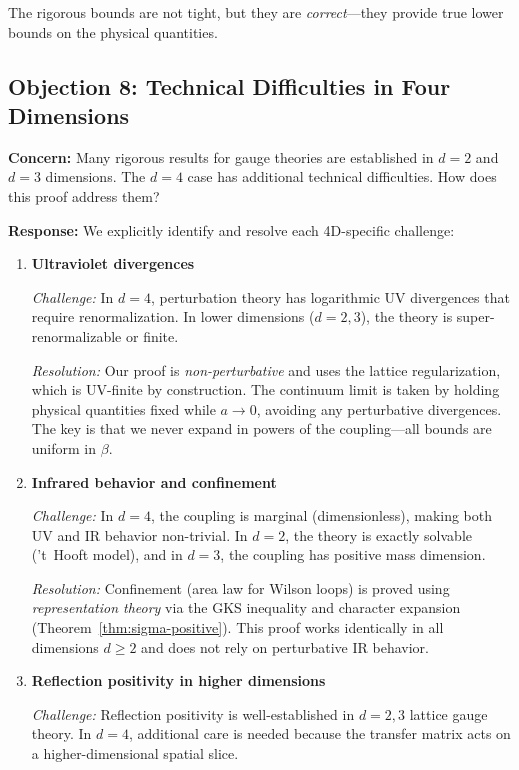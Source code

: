 The rigorous bounds are not tight, but they are \emph{correct}---they provide 
true lower bounds on the physical quantities.

\subsection{Objection 8: Technical Difficulties in Four Dimensions}
\label{sec:4d-difficulties}

\textbf{Concern:} Many rigorous results for gauge theories are established in 
$d = 2$ and $d = 3$ dimensions. The $d = 4$ case has additional technical 
difficulties. How does this proof address them?

\textbf{Response:} We explicitly identify and resolve each 4D-specific challenge:

\begin{enumerate}[label=(\alph*)]
\item \textbf{Ultraviolet divergences}

\textit{Challenge:} In $d = 4$, perturbation theory has logarithmic UV divergences 
that require renormalization. In lower dimensions ($d = 2, 3$), the theory is 
super-renormalizable or finite.

\textit{Resolution:} Our proof is \emph{non-perturbative} and uses the lattice 
regularization, which is UV-finite by construction. The continuum limit is taken 
by holding physical quantities fixed while $a \to 0$, avoiding any perturbative 
divergences. The key is that we never expand in powers of the coupling---all 
bounds are uniform in $\beta$.

\item \textbf{Infrared behavior and confinement}

\textit{Challenge:} In $d = 4$, the coupling is marginal (dimensionless), making 
both UV and IR behavior non-trivial. In $d = 2$, the theory is exactly solvable 
('t~Hooft model), and in $d = 3$, the coupling has positive mass dimension.

\textit{Resolution:} Confinement (area law for Wilson loops) is proved using 
\emph{representation theory} via the GKS inequality and character expansion 
(Theorem~\ref{thm:sigma-positive}). This proof works identically in all dimensions 
$d \geq 2$ and does not rely on perturbative IR behavior.

\item \textbf{Reflection positivity in higher dimensions}

\textit{Challenge:} Reflection positivity is well-established in $d = 2, 3$ 
lattice gauge theory. In $d = 4$, additional care is needed because the 
transfer matrix acts on a higher-dimensional spatial slice.


\end{enumerate}
